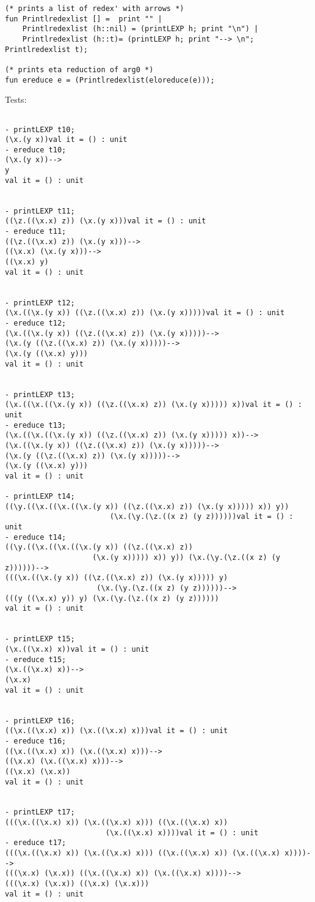 \documentclass[11pt]{article}
\begin{document}
\begin{enumerate}
\begin{verbatim}
(* prints a list of redex' with arrows *)
fun Printlredexlist [] =  print "" |
    Printlredexlist (h::nil) = (printLEXP h; print "\n") |
    Printlredexlist (h::t)= (printLEXP h; print "--> \n"; Printlredexlist t);
    
(* prints eta reduction of arg0 *)
fun ereduce e = (Printlredexlist(eloreduce(e)));

	      \end{verbatim}
	      Tests:
	      \begin{verbatim}
	      
- printLEXP t10;
(\x.(y x))val it = () : unit
- ereduce t10;
(\x.(y x))-->
y
val it = () : unit


- printLEXP t11;
((\z.((\x.x) z)) (\x.(y x)))val it = () : unit
- ereduce t11;
((\z.((\x.x) z)) (\x.(y x)))-->
((\x.x) (\x.(y x)))-->
((\x.x) y)
val it = () : unit


- printLEXP t12;
(\x.((\x.(y x)) ((\z.((\x.x) z)) (\x.(y x)))))val it = () : unit
- ereduce t12;
(\x.((\x.(y x)) ((\z.((\x.x) z)) (\x.(y x)))))-->
(\x.(y ((\z.((\x.x) z)) (\x.(y x)))))-->
(\x.(y ((\x.x) y)))
val it = () : unit


- printLEXP t13;
(\x.((\x.((\x.(y x)) ((\z.((\x.x) z)) (\x.(y x))))) x))val it = () : unit
- ereduce t13;
(\x.((\x.((\x.(y x)) ((\z.((\x.x) z)) (\x.(y x))))) x))-->
(\x.((\x.(y x)) ((\z.((\x.x) z)) (\x.(y x)))))-->
(\x.(y ((\z.((\x.x) z)) (\x.(y x)))))-->
(\x.(y ((\x.x) y)))
val it = () : unit

- printLEXP t14;
((\y.((\x.((\x.((\x.(y x)) ((\z.((\x.x) z)) (\x.(y x))))) x)) y)) 
                        (\x.(\y.(\z.((x z) (y z))))))val it = () : unit
- ereduce t14;
((\y.((\x.((\x.((\x.(y x)) ((\z.((\x.x) z)) 
                    (\x.(y x))))) x)) y)) (\x.(\y.(\z.((x z) (y z))))))-->
(((\x.((\x.(y x)) ((\z.((\x.x) z)) (\x.(y x))))) y) 
                     (\x.(\y.(\z.((x z) (y z))))))-->
(((y ((\x.x) y)) y) (\x.(\y.(\z.((x z) (y z))))))
val it = () : unit


- printLEXP t15;
(\x.((\x.x) x))val it = () : unit
- ereduce t15;
(\x.((\x.x) x))-->
(\x.x)
val it = () : unit


- printLEXP t16;
((\x.((\x.x) x)) (\x.((\x.x) x)))val it = () : unit
- ereduce t16;
((\x.((\x.x) x)) (\x.((\x.x) x)))-->
((\x.x) (\x.((\x.x) x)))-->
((\x.x) (\x.x))
val it = () : unit


- printLEXP t17;
(((\x.((\x.x) x)) (\x.((\x.x) x))) ((\x.((\x.x) x)) 
                       (\x.((\x.x) x))))val it = () : unit
- ereduce t17;
(((\x.((\x.x) x)) (\x.((\x.x) x))) ((\x.((\x.x) x)) (\x.((\x.x) x))))-->
(((\x.x) (\x.x)) ((\x.((\x.x) x)) (\x.((\x.x) x))))-->
(((\x.x) (\x.x)) ((\x.x) (\x.x)))
val it = () : unit


\end{verbatim}
\end{enumerate}
\end{document}
